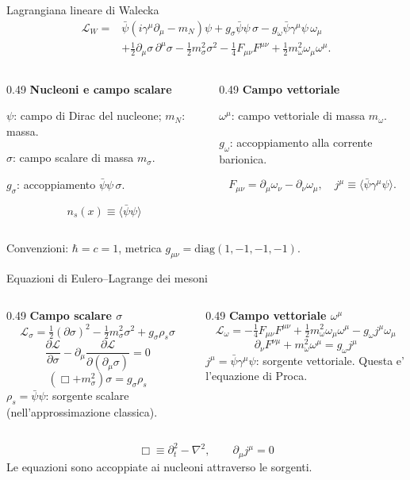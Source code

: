 \begin{frame}{Lagrangiana lineare di Walecka}
\footnotesize
\[
\begin{aligned}
\mathcal L_W={}&\bar\psi(i\gamma^\mu\partial_\mu-m_N)\psi
+g_\sigma\bar\psi\psi\,\sigma
-g_\omega\bar\psi\gamma^\mu\psi\,\omega_\mu\\
&+\frac12\partial_\mu\sigma\,\partial^\mu\sigma
-\frac12m_\sigma^2\sigma^2
-\frac14F_{\mu\nu}F^{\mu\nu}
+\frac12m_\omega^2\omega_\mu\omega^\mu .
\end{aligned}
\]
\begin{columns}[T,onlytextwidth]
\begin{column}{0.49\textwidth}
\textbf{Nucleoni e campo scalare}\par\smallskip
\(\psi\): campo di Dirac del nucleone; \(m_N\): massa.\par
\(\sigma\): campo scalare di massa \(m_\sigma\).\par
\(g_\sigma\): accoppiamento \(\bar\psi\psi\,\sigma\).\par
\[
n_s(x)\equiv\langle\bar\psi\psi\rangle
\]
\end{column}
\begin{column}{0.49\textwidth}
\textbf{Campo vettoriale}\par\smallskip
\(\omega^\mu\): campo vettoriale di massa \(m_\omega\).\par
\(g_\omega\): accoppiamento alla corrente barionica.\par
\[
F_{\mu\nu}=\partial_\mu\omega_\nu-\partial_\nu\omega_\mu,
\quad j^\mu\equiv\langle\bar\psi\gamma^\mu\psi\rangle.
\]
\end{column}
\end{columns}
\smallskip
Convenzioni: \(\hbar=c=1\), metrica \(g_{\mu\nu}=\mathrm{diag}(1,-1,-1,-1)\).
\end{frame}

\begin{frame}{Equazioni di Eulero--Lagrange dei mesoni}
\footnotesize
\begin{columns}[T,onlytextwidth]
\begin{column}{0.49\textwidth}
\textbf{Campo scalare \(\sigma\)}
\[
\mathcal L_\sigma=\tfrac12(\partial\sigma)^2
-\tfrac12m_\sigma^2\sigma^2+g_\sigma\rho_s\sigma
\]
\[
\frac{\partial\mathcal L}{\partial\sigma}
-\partial_\mu\frac{\partial\mathcal L}
{\partial(\partial_\mu\sigma)}=0
\]
\[
(\Box+m_\sigma^2)\sigma=g_\sigma\rho_s
\]
\(\rho_s=\bar\psi\psi\): sorgente scalare
(nell'approssimazione classica).
\end{column}
\begin{column}{0.49\textwidth}
\textbf{Campo vettoriale \(\omega^\mu\)}
\[
\mathcal L_\omega=-\tfrac14F_{\mu\nu}F^{\mu\nu}
+\tfrac12m_\omega^2\omega_\mu\omega^\mu
-g_\omega j^\mu\omega_\mu
\]
\[
\partial_\nu F^{\nu\mu}+m_\omega^2\omega^\mu
=g_\omega j^\mu
\]
\(j^\mu=\bar\psi\gamma^\mu\psi\): sorgente vettoriale.
Questa e' l'equazione di Proca.
\end{column}
\end{columns}
\medskip
\[
\Box\equiv\partial_t^2-\nabla^2,
\qquad \partial_\mu j^\mu=0
\]
Le equazioni sono accoppiate ai nucleoni attraverso le sorgenti.
\end{frame}

